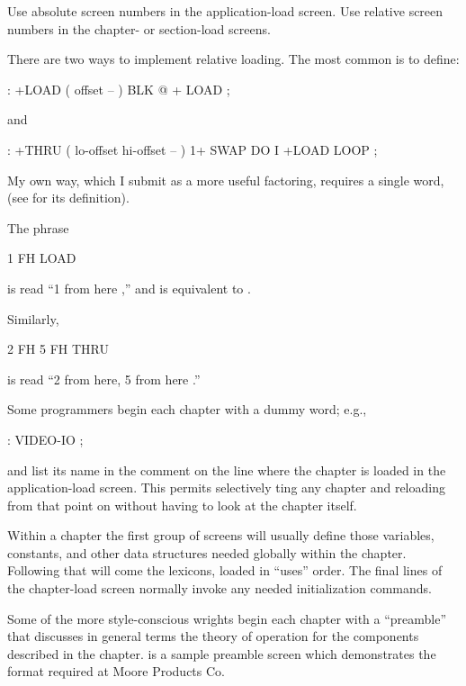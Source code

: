%
\begin{tip}
Use absolute screen numbers in the application-load screen.  Use
relative screen numbers in the chapter- or section-load screens.
\end{tip}
There are two ways to implement relative loading.
The most common is to define:
\begin{Code}
: +LOAD  ( offset -- )  BLK @ +  LOAD ;
\end{Code}
and
\begin{Code}
: +THRU  ( lo-offset hi-offset -- )
     1+ SWAP DO  I +LOAD  LOOP ;
\end{Code}
My own way, which I submit as a more useful factoring, requires a
single word,  (see  for its definition).

The phrase
\begin{Code}
1 FH LOAD
\end{Code}
is read ``1 from here ,'' and is equivalent
to .

Similarly,
\begin{Code}
2 FH   5 FH THRU
\end{Code}
is read ``2 from here, 5 from here .''

Some programmers begin each chapter with a dummy word; e.g.,
\begin{Code}
: VIDEO-IO ;
\end{Code}
and list its name in the comment on the line where the chapter is
loaded in the application-load screen.  This permits selectively
ting any chapter and reloading from that point on
without having to look at the chapter itself.

Within a chapter the first group of screens will usually define those
variables, constants, and other data structures needed globally within
the chapter.  Following that will come the lexicons, loaded in
``uses'' order.  The final lines of the chapter-load screen normally
invoke any needed initialization commands.

%
Some of the more style-conscious \Forth{}wrights begin each chapter
with a ``preamble'' that discusses in general terms the theory of
operation for the components described in the chapter.  
is a sample preamble screen which demonstrates the format required at
Moore Products Co.

